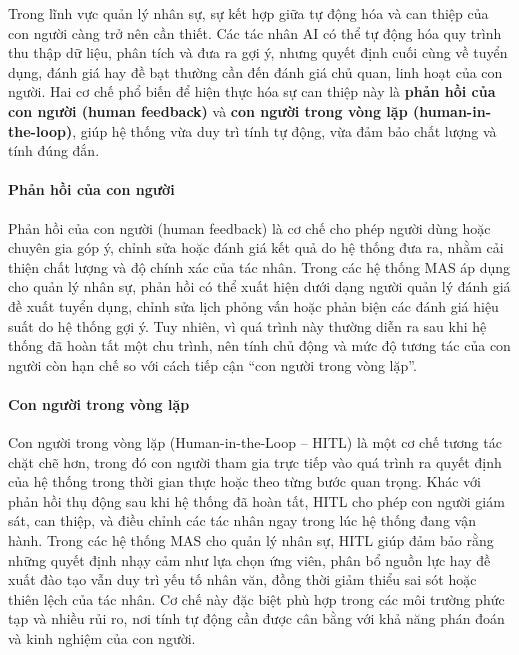 \documentclass{article}
\begin{document}
Trong lĩnh vực quản lý nhân sự, sự kết hợp giữa tự động hóa và can thiệp của con người càng trở nên cần thiết. Các tác nhân AI có thể tự động hóa quy trình thu thập dữ liệu, phân tích và đưa ra gợi ý, nhưng quyết định cuối cùng về tuyển dụng, đánh giá hay đề bạt thường cần đến đánh giá chủ quan, linh hoạt của con người. Hai cơ chế phổ biến để hiện thực hóa sự can thiệp này là \textbf{phản hồi của con người (human feedback)} và \textbf{con người trong vòng lặp (human-in-the-loop)}, giúp hệ thống vừa duy trì tính tự động, vừa đảm bảo chất lượng và tính đúng đắn.

\paragraph{Phản hồi của con người}

Phản hồi của con người (human feedback) là cơ chế cho phép người dùng hoặc chuyên gia góp ý, chỉnh sửa hoặc đánh giá kết quả do hệ thống đưa ra, nhằm cải thiện chất lượng và độ chính xác của tác nhân. Trong các hệ thống MAS áp dụng cho quản lý nhân sự, phản hồi có thể xuất hiện dưới dạng người quản lý đánh giá đề xuất tuyển dụng, chỉnh sửa lịch phỏng vấn hoặc phản biện các đánh giá hiệu suất do hệ thống gợi ý. Tuy nhiên, vì quá trình này thường diễn ra sau khi hệ thống đã hoàn tất một chu trình, nên tính chủ động và mức độ tương tác của con người còn hạn chế so với cách tiếp cận “con người trong vòng lặp”.

\paragraph{Con người trong vòng lặp}

Con người trong vòng lặp (Human-in-the-Loop – HITL) là một cơ chế tương tác chặt chẽ hơn, trong đó con người tham gia trực tiếp vào quá trình ra quyết định của hệ thống trong thời gian thực hoặc theo từng bước quan trọng. Khác với phản hồi thụ động sau khi hệ thống đã hoàn tất, HITL cho phép con người giám sát, can thiệp, và điều chỉnh các tác nhân ngay trong lúc hệ thống đang vận hành. Trong các hệ thống MAS cho quản lý nhân sự, HITL giúp đảm bảo rằng những quyết định nhạy cảm như lựa chọn ứng viên, phân bổ nguồn lực hay đề xuất đào tạo vẫn duy trì yếu tố nhân văn, đồng thời giảm thiểu sai sót hoặc thiên lệch của tác nhân. Cơ chế này đặc biệt phù hợp trong các môi trường phức tạp và nhiều rủi ro, nơi tính tự động cần được cân bằng với khả năng phán đoán và kinh nghiệm của con người.
\end{document}
